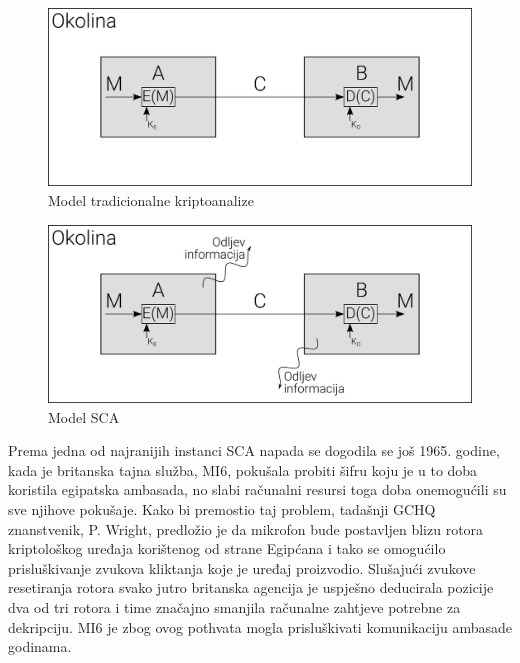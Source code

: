\documentclass[times, utf8, diplomski]{fer}
\begin{document}
\begin{figure}[htb]
    \centering
    \includegraphics[width=12cm]{resources/images/SCA/traditional_model.png}
    \caption{Model tradicionalne kriptoanalize}
    \label{fig:traditional_model}
\end{figure}

\begin{figure}[htb]
    \centering
    \includegraphics[width=12cm]{resources/images/SCA/SCA_model.png}
    \caption{Model SCA}
    \label{fig:SCA_model}
\end{figure}

Prema \cite{zhou2005side} jedna od najranijih instanci SCA napada se dogodila se još 1965. godine, kada je britanska tajna služba, MI6, pokušala probiti šifru koju je u to doba koristila egipatska ambasada, no slabi računalni resursi toga doba onemogućili su sve njihove pokušaje. Kako bi premostio taj problem, tadašnji GCHQ znanstvenik, P. Wright, predložio je da mikrofon bude postavljen blizu rotora kriptološkog uređaja korištenog od strane Egipćana i tako se omogućilo prisluškivanje zvukova kliktanja koje je uređaj proizvodio. Slušajući zvukove resetiranja rotora svako jutro britanska agencija je uspješno deducirala pozicije dva od tri rotora i time značajno smanjila računalne zahtjeve potrebne za dekripciju. MI6 je zbog ovog pothvata mogla prisluškivati komunikaciju ambasade godinama.
\end{document}
